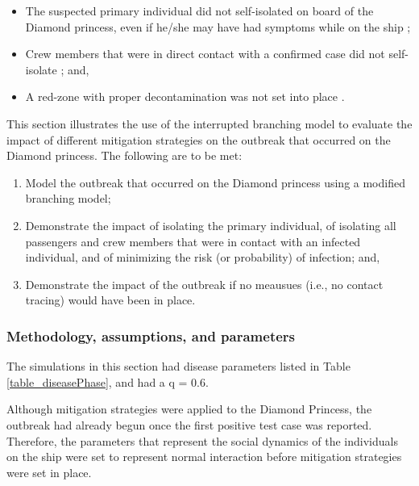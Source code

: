 \documentclass[sr]{drdc-report}
\begin{document}
\begin{itemize} 
\item The suspected primary individual did not self-isolated on board of the Diamond princess, even if he/she may have had symptoms while on the ship \cite{news_patient_zero}\cite{10..1016/j..ijid..2020..02..033};
\item Crew members that were in direct contact with a confirmed case did not self-isolate \cite{10..1002/jgf2..326} \cite{10..15585/mmwr..mm6912e3}; and,
\item A red-zone with proper decontamination was not set into place \cite{10..1002/jgf2..326}. 
\end{itemize}	
 
This section illustrates the use of the interrupted branching model to evaluate the impact of different mitigation strategies on the outbreak that occurred on the Diamond princess. The following are to be met:

\begin{enumerate}
\item Model the outbreak that occurred on the Diamond princess using a modified branching model;
\item Demonstrate the impact of isolating the primary individual, of isolating all passengers and crew members that were in contact with an infected individual, and of minimizing the risk (or probability) of infection; and, 
\item Demonstrate the impact of the outbreak if no meausues (i.e., no contact tracing) would have been in place.
\end{enumerate}

\subsubsection{Methodology, assumptions, and parameters}

The simulations in this section had disease parameters listed in Table \ref{table_diseasePhase}, and had a q = 0.6. 

Although mitigation strategies were applied to the Diamond Princess, the outbreak had already begun once the first positive test case was reported. Therefore, the parameters that represent the social dynamics of the individuals on the ship were set to represent normal interaction before mitigation strategies were set in place. 
\end{document}
